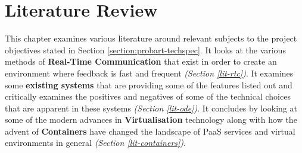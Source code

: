 
\chapter{Literature Review} \label{lit}


This chapter examines various literature around relevant subjects to the project objectives stated in Section \ref{section:probart-techspec}. It looks at the various methods of \textbf{Real-Time Communication} that exist in order to create an environment where feedback is fast and frequent \textit{(Section \ref{lit-rtc})}. It examines some \textbf{existing systems} that are providing some of the features listed out and critically examines the positives and negatives of some of the technical choices that are apparent in these systems \textit{(Section \ref{lit-ode})}. It concludes by looking at some of the modern advances in \textbf{Virtualisation} technology along with how the advent of \textbf{Containers} have changed the landscape of PaaS services and virtual environments in general \textit{(Section \ref{lit-containers})}.



